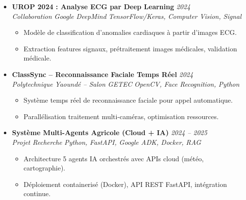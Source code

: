 \documentclass[a4paper,11pt]{article}
\begin{document}
\begin{itemize}[leftmargin=*, label={-}]
\item \textbf{UROP 2024 : Analyse ECG par Deep Learning} \hfill \textit{2024} \\
\textit{Collaboration Google DeepMind} \hfill \textit{TensorFlow/Keras, Computer Vision, Signal}
\vspace{-2pt}
    \begin{itemize}[leftmargin=0.4cm, nosep, label=\tiny$\bullet$]
        \item \small{Modèle de classification d'anomalies cardiaques à partir d'images ECG.}
        \item \small{Extraction features signaux, prétraitement images médicales, validation médicale.}
    \end{itemize}
\vspace{3pt}

\item \textbf{ClassSync -- Reconnaissance Faciale Temps Réel} \hfill \textit{2024} \\
\textit{Polytechnique Yaoundé -- Salon GETEC} \hfill \textit{OpenCV, Face Recognition, Python}
\vspace{-2pt}
    \begin{itemize}[leftmargin=0.4cm, nosep, label=\tiny$\bullet$]
        \item \small{Système temps réel de reconnaissance faciale pour appel automatique.}
        \item \small{Parallélisation traitement multi-caméras, optimisation ressources.}
    \end{itemize}
\vspace{3pt}

\item \textbf{Système Multi-Agents Agricole (Cloud + IA)} \hfill \textit{2024 -- 2025} \\
\textit{Projet Recherche} \hfill \textit{Python, FastAPI, Google ADK, Docker, RAG}
\vspace{-2pt}
    \begin{itemize}[leftmargin=0.4cm, nosep, label=\tiny$\bullet$]
        \item \small{Architecture 5 agents IA orchestrés avec APIs cloud (météo, cartographie).}
        \item \small{Déploiement containerisé (Docker), API REST FastAPI, intégration continue.}
    \end{itemize}
\vspace{3pt}

\end{itemize}
\end{document}

